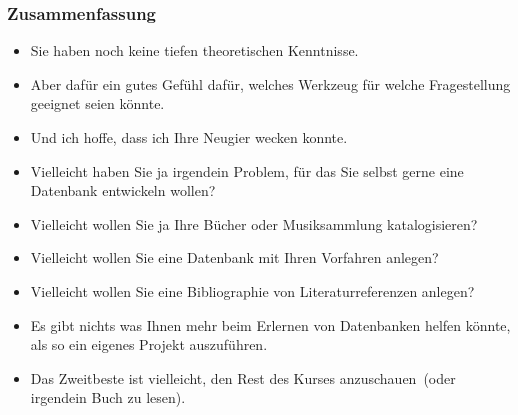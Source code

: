 \documentclass[aspectratio=169,mathserif,notheorems]{beamer}%
\begin{document}
%
\begin{frame}%
\frametitle{Zusammenfassung}%
\begin{itemize}%
%
%
\item<2-> Sie haben noch keine tiefen theoretischen Kenntnisse.%
%
\item<3-> Aber dafür ein gutes Gefühl dafür, welches Werkzeug für welche Fragestellung geeignet seien könnte.%
%
\item<4-> Und ich hoffe, dass ich Ihre Neugier wecken konnte.%
%
\item<5-> Vielleicht haben Sie ja irgendein Problem, für das Sie selbst gerne eine Datenbank entwickeln wollen?%
%
\item<6-> Vielleicht wollen Sie ja Ihre Bücher oder Musiksammlung katalogisieren?%
%
\item<7-> Vielleicht wollen Sie eine Datenbank mit Ihren Vorfahren anlegen?%
%
\item<8-> Vielleicht wollen Sie eine Bibliographie von Literaturreferenzen anlegen?%
%
\item<9-> Es gibt nichts was Ihnen mehr beim Erlernen von Datenbanken helfen könnte, als so ein eigenes Projekt auszuführen.%
%
\item<10-> Das Zweitbeste ist vielleicht, den Rest des Kurses anzuschauen~(oder irgendein Buch zu lesen).%
\end{itemize}%
\end{frame}
%
\endPresentation%
\end{document}
